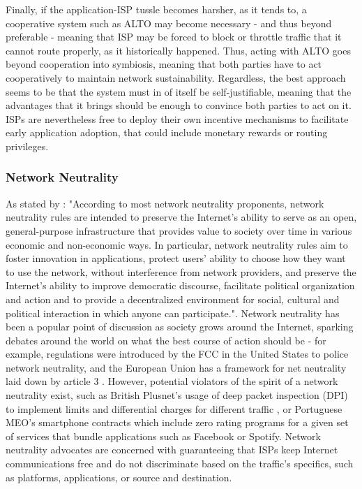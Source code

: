     Finally, if the application-ISP tussle becomes harsher, as it tends to, a cooperative system such as ALTO may become necessary - and thus beyond preferable - meaning that ISP may be forced to block or throttle traffic that it cannot route properly, as it historically happened.
    Thus, acting with ALTO goes beyond cooperation into symbiosis, meaning that both parties have to act cooperatively to maintain network sustainability.
    Regardless, the best approach seems to be that the system must in of itself be self-justifiable, meaning that the advantages that it brings should be enough to convince both parties to act on it.
    ISPs are nevertheless free to deploy their own incentive mechanisms to facilitate early application adoption, that could include monetary rewards or routing privileges.

\subsubsection{Network Neutrality}
    As stated by \cite{qos-framework}: "According to most network neutrality proponents, network neutrality rules are intended to preserve the Internet's ability to serve as an open, general-purpose infrastructure that provides value to society over time in various economic and non-economic ways. In particular, network neutrality rules aim to foster innovation in applications, protect users' ability to choose how they want to use the network, without interference from network providers, and preserve the Internet's ability to improve democratic discourse, facilitate political organization and action and to provide a decentralized environment for social, cultural and political interaction in which anyone can participate.".
    Network neutrality has been a popular point of discussion as society grows around the Internet, sparking debates around the world on what the best course of action should be - for example, regulations were introduced by the FCC in the United States \cite{fcc} to police network neutrality, and the European Union has a framework for net neutrality laid down by article 3 \cite{article-3}.
    However, potential violators of the spirit of a network neutrality exist, such as British Plusnet's usage of deep packet inspection (DPI) to implement limits and differential charges for different traffic \cite{arstechnica}, or Portuguese MEO's smartphone contracts which include zero rating programs for a given set of services \cite{meo-packages} that bundle applications such as Facebook or Spotify.
    Network neutrality advocates are concerned with guaranteeing that ISPs keep Internet communications free and do not discriminate based on the traffic's specifics, such as platforms, applications, or source and destination.
